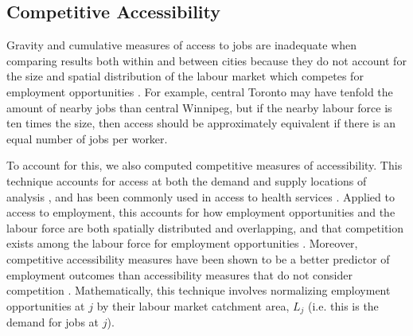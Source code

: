 \documentclass[11 pt, letterpaper]{article}
\begin{document}
{\subsection{Competitive Accessibility}

Gravity and cumulative measures of access to jobs are inadequate when comparing results both within and between cities because they do not account for the size and spatial distribution of the labour market which competes for employment opportunities \cite{shen1998}. For example, central Toronto may have tenfold the amount of nearby jobs than central Winnipeg, but if the nearby labour force is ten times the size, then access should be approximately equivalent if there is an equal number of jobs per worker.

To account for this, we also computed competitive measures of accessibility. This technique accounts for access at both the demand and supply locations of analysis \cite{weibull1976}, and has been commonly used in access to health services \cite{luo2003,delamater2013}. Applied to access to employment, this accounts for how employment opportunities and the labour force are both spatially distributed and overlapping, and that competition exists among the labour force for employment opportunities . Moreover, competitive accessibility measures have been shown to be a better predictor of employment outcomes than accessibility measures that do not consider competition \cite{merlin2017}. Mathematically, this technique involves normalizing employment opportunities at $j$ by their labour market catchment area, $L_j$ (i.e. this is the demand for jobs at $j$).

}
\end{document}
